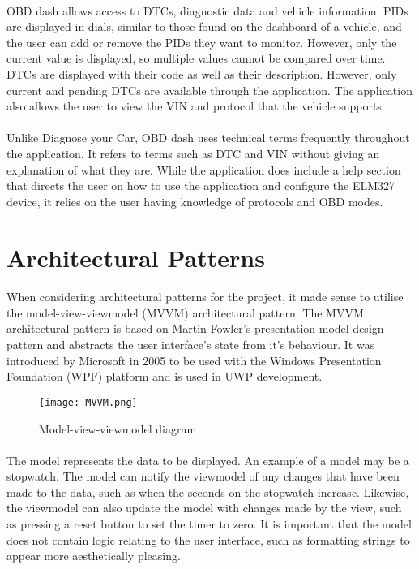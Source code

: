 		\paragraph{}{
		OBD dash allows access to DTCs, diagnostic data and vehicle information. PIDs are displayed in dials, similar to those found on the dashboard of a vehicle, and the user can add or remove the PIDs they want to monitor. However, only the current value is displayed, so multiple values cannot be compared over time. DTCs are displayed with their code as well as their description. However, only current and pending DTCs are available through the application. The application also allows the user to view the VIN and protocol that the vehicle supports.
		}
		\paragraph{}{
		Unlike Diagnose your Car, OBD dash uses technical terms frequently throughout the application. It refers to terms such as DTC and VIN without giving an explanation of what they are. While the application does include a help section that directs the user on how to use the application and configure the ELM327 device, it relies on the user having knowledge of protocols and OBD modes.
		}

\section{Architectural Patterns}
	\paragraph{}{
	When considering architectural patterns for the project, it made sense to utilise the model-view-viewmodel (MVVM) architectural pattern. The MVVM architectural pattern is based on Martin Fowler's presentation model design pattern and abstracts the user interface's state from it's behaviour. It was introduced by Microsoft in 2005 to be used with the Windows Presentation Foundation (WPF) platform and is used in UWP development.
			\begin{figure}[h]
				\begin{center}											
					\texttt{[image: MVVM.png]}
					\caption{Model-view-viewmodel diagram}											\label{fig:MVVM}
				\end{center}
			\end{figure}
	}
	\paragraph{}{
	The model represents the data to be displayed. An example of a model may be a stopwatch. The model can notify the viewmodel of any changes that have been made to the data, such as when the seconds on the stopwatch increase. Likewise, the viewmodel can also update the model with changes made by the view, such as pressing a reset button to set the timer to zero. It is important that the model does not contain logic relating to the user interface, such as formatting strings to appear more aesthetically pleasing.
	}
